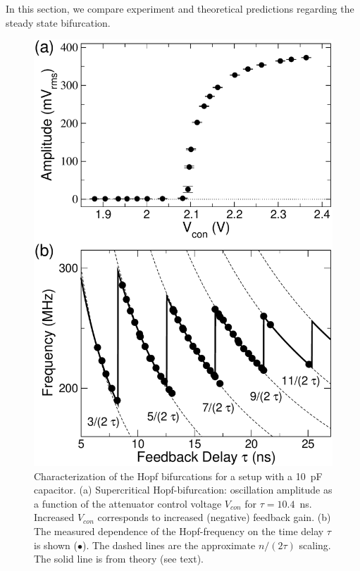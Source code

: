 \documentclass[aps,twocolumn,pre,nofootinbib]{revtex4}
\begin{document}
In this section, we compare experiment and theoretical predictions regarding the steady state bifurcation.


%
%
% 
\begin{figure}
\includegraphics*[width=\breite \columnwidth]{Fig3} 
\caption{Characterization of the Hopf bifurcations for a setup with a 10~pF capacitor. (a) Supercritical Hopf-bifurcation: oscillation amplitude as a function of the attenuator control voltage $V_{con}$ for $\tau=10.4$~ns. Increased $V_{con}$ corresponds to increased (negative) feedback gain. (b) The measured dependence of the Hopf-frequency on the time delay $\tau$ is shown ($\bullet$). The dashed lines are the approximate $n/(2 \tau)$ scaling. The solid line is from theory (see text).   }
\label{fig:transfreq}
\end{figure}
\end{document}
